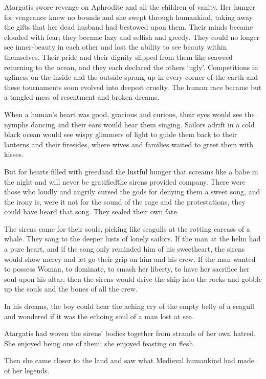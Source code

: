 Atargatis swore revenge on Aphrodite and all the children of
vanity. Her hunger for vengeance knew no bounds and she swept through
humankind, taking away the gifts that her dead husband had bestowed
upon them. Their minds became clouded with fear; they became lazy and
selfish and greedy. They could no longer see inner-beauty in each
other and lost the ability to see beauty within themselves. Their
pride and their dignity slipped from them like seaweed returning to
the ocean, and they each declared the others ‘ugly’. Competitions in
ugliness on the inside and the outside sprang up in every corner of
the earth and these tournaments soon evolved into deepest cruelty. The
human race became but a tangled mess of resentment and broken dreams.

When a human’s heart was good, gracious and curious, their eyes would
see the nymphs dancing and their ears would hear them singing. Sailors
adrift in a cold black ocean would see wispy glimmers of light to
guide them back to their lanterns and their firesides, where wives and
families waited to greet them with kisses.

But for hearts filled with greed\=and the lustful hunger that screams
like a babe in the night and will never be gratified\=the sirens
provided company. There were those who loudly and angrily cursed the
gods for denying them a sweet song, and the irony is, were it not for
the sound of the rage and the protestations, they could have heard
that song. They sealed their own fate.

The sirens came for their souls, picking like seagulls at the rotting
carcass of a whale. They sang to the deeper lusts of lonely
sailors. If the man at the helm had a pure heart, and if the song only
reminded him of his sweetheart, the sirens would show mercy and let go
their grip on him and his crew. If the man wanted to possess Woman, to
dominate, to smash her liberty, to have her sacrifice her soul upon
his altar, then the sirens would drive the ship into the rocks and
gobble up the souls and the bones of all the crew.

In his dreams, the boy could hear the aching cry of the empty belly of
a seagull and wondered if it was the echoing soul of a man lost at
sea.

Atargatis had woven the sirens’ bodies together from strands of her
own hatred. She enjoyed being one of them; she enjoyed feasting on
flesh.

Then she came closer to the land and saw what Medieval humankind had
made of her legends.

